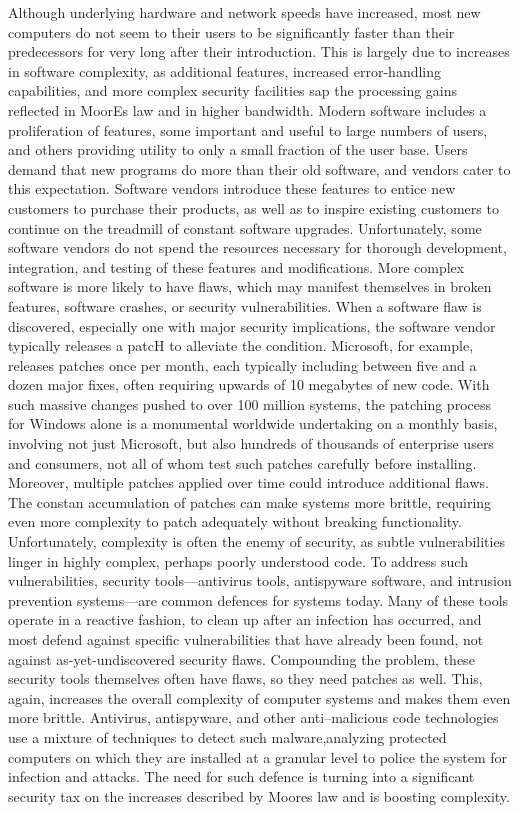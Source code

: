 \documentclass[11pt,a4paper]{article}
\begin{document}
 	Although underlying hardware and network speeds have increased, most new computers do not seem to their users to be significantly faster than their
predecessors for very long after their introduction. This is largely due to increases in software complexity, as additional features, increased error-handling
capabilities, and more complex security facilities sap the processing gains reflected in MoorEs law and in higher bandwidth. Modern software includes a
proliferation of features, some important and useful to large numbers of users, and others providing utility to only a small fraction of the user base. Users demand that new programs do more than their old software, and
vendors cater to this expectation. Software vendors introduce these features to entice new customers to purchase their products, as well as to inspire existing
customers to continue on the treadmill of constant software upgrades. Unfortunately, some software vendors do not spend the resources necessary for
thorough development, integration, and testing of these features and modifications. More complex software is more likely to have
flaws, which may manifest themselves in broken features, software crashes, or security vulnerabilities. When a software flaw is discovered, especially one with
major security implications, the software vendor typically releases a patcH to alleviate the condition. Microsoft, for example, releases patches once per
month, each typically including between five and a dozen major fixes, often requiring upwards of 10 megabytes of new code. With such massive changes
pushed to over 100 million systems, the patching process for Windows alone is a monumental worldwide undertaking on a monthly basis, involving not just
Microsoft, but also hundreds of thousands of enterprise users and consumers, not all of whom test such patches carefully before installing.
Moreover, multiple patches applied over time could introduce additional flaws. The constan accumulation of patches can make systems more
brittle, requiring even more complexity to patch adequately without breaking functionality. Unfortunately, complexity is often the enemy of
security, as subtle vulnerabilities linger in highly complex, perhaps poorly understood code. To address such vulnerabilities, security tools—antivirus tools,
antispyware software, and intrusion prevention systems—are common defences for systems today. Many of these tools operate in a reactive fashion, to
clean up after an infection has occurred, and most defend against specific vulnerabilities that have already been found, not against as-yet-undiscovered security flaws. Compounding the problem, these security tools themselves often have flaws, so they need patches as well. This, again, increases the overall complexity of computer systems and makes them even more brittle.
Antivirus, antispyware, and other anti–malicious code technologies use a mixture of techniques to detect such malware,analyzing protected computers on which
they are installed at a granular level to police the system for infection and attacks. The need for such defence is turning into a significant security tax on the increases described by Moores law and is boosting complexity.\\
\end{document}
